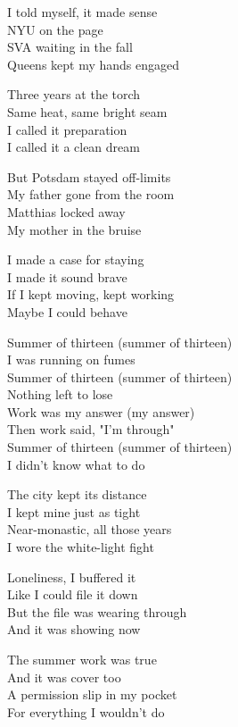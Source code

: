 \begin{lyrics}
I told myself, it made sense\\
NYU on the page\\
SVA waiting in the fall\\
Queens kept my hands engaged

Three years at the torch\\
Same heat, same bright seam\\
I called it preparation\\
I called it a clean dream

But Potsdam stayed off-limits\\
My father gone from the room\\
Matthias locked away\\
My mother in the bruise

I made a case for staying\\
I made it sound brave\\
If I kept moving, kept working\\
Maybe I could behave

Summer of thirteen (summer of thirteen)\\
I was running on fumes\\
Summer of thirteen (summer of thirteen)\\
Nothing left to lose\\
Work was my answer (my answer)\\
Then work said, "I’m through"\\
Summer of thirteen (summer of thirteen)\\
I didn’t know what to do

The city kept its distance\\
I kept mine just as tight\\
Near-monastic, all those years\\
I wore the white-light fight

Loneliness, I buffered it\\
Like I could file it down\\
But the file was wearing through\\
And it was showing now

The summer work was true\\
And it was cover too\\
A permission slip in my pocket\\
For everything I wouldn’t do


\end{lyrics}
